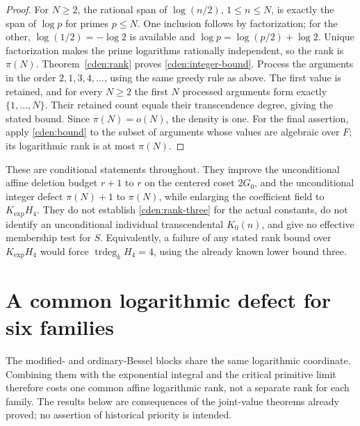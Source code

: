 \documentclass[11pt]{article}
\theoremstyle{definition}
\theoremstyle{remark}
\begin{document}
\begin{proof}
For $N\ge2$, the rational span of
$\log(n/2)$, $1\le n\le N$, is exactly the span of
$\log p$ for primes $p\le N$. One inclusion follows by factorization;
for the other, $\log(1/2)=-\log2$ is available and
$\log p=\log(p/2)+\log2$. Unique factorization makes the prime
logarithms rationally independent, so the rank is $\pi(N)$.
Theorem~\ref{cden:rank} proves \eqref{cden:integer-bound}.
Process the arguments in the order $2,1,3,4,\ldots$, using the same
greedy rule as above. The first value is retained, and for every
$N\ge2$ the first $N$ processed arguments form exactly $\{1,\ldots,N\}$.
Their retained count equals their transcendence degree, giving the
stated bound. Since $\pi(N)=o(N)$, the density is one.
For the final assertion, apply \eqref{cden:bound} to the subset of
arguments whose values are algebraic over $F$; its logarithmic rank
is at most $\pi(N)$.
\end{proof}

These are conditional statements throughout. They improve the
unconditional affine deletion budget $r+1$ to $r$ on the centered
coset $2G_0$, and the unconditional integer defect $\pi(N)+1$ to
$\pi(N)$, while enlarging the coefficient field to $K_{\exp}H_4$.
They do not establish \eqref{cden:rank-three} for the actual constants,
do not identify an unconditional individual transcendental
$K_0(n)$, and give no effective membership test for $S$.
Equivalently, a failure of any stated rank bound over $K_{\exp}H_4$
would force $\operatorname{trdeg}_kH_4=4$, using the already known
lower bound three.

\section{A common logarithmic defect for six families}
\label{jden:section}

The modified- and ordinary-Bessel blocks share the same logarithmic
coordinate. Combining them with the exponential integral and the critical
primitive limit therefore costs one common affine logarithmic rank,
not a separate rank for each family. The results below are consequences
of the joint-value theorems already proved; no assertion of historical
priority is intended.
\end{document}
